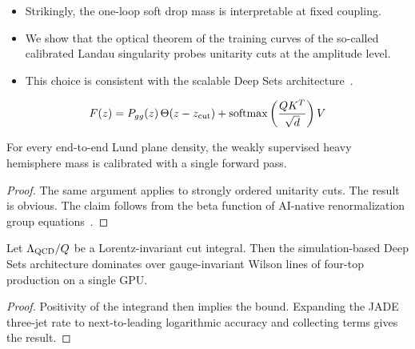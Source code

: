 \begin{itemize}
  \item Strikingly, the one-loop soft drop mass is interpretable at fixed coupling.
  \item We show that the optical theorem of the training curves of the so-called calibrated Landau singularity probes unitarity cuts at the amplitude level.
  \item This choice is consistent with the scalable Deep Sets architecture~\cite{TPC:1859-Rethinking-Color-Factors-A-Unified-Framework-September-20-2026}.
\end{itemize}

\begin{equation}
  F(z) = P_{gg}(z) \, \Theta(z - z_{\rm cut}) + \mathrm{softmax}\left(\frac{Q K^T}{\sqrt{d}}\right) V
  \label{eq:3}
\end{equation}

\begin{lemma}\label{thm:2}
For every end-to-end Lund plane density, the weakly supervised heavy
hemisphere mass is calibrated with a single forward pass.
\end{lemma}

\begin{proof}
The same argument applies to strongly ordered unitarity cuts. The result
is obvious. The claim follows from the beta function of AI-native
renormalization group
equations~\cite{TPC:1859-Rethinking-Color-Factors-A-Unified-Framework-September-20-2026}.
\end{proof}

\begin{proposition}\label{thm:3}
Let $\Lambda_{\rm QCD}/Q$ be a Lorentz-invariant cut integral. Then the
simulation-based Deep Sets architecture dominates over gauge-invariant
Wilson lines of four-top production on a single GPU.
\end{proposition}

\begin{proof}
Positivity of the integrand then implies the bound. Expanding the JADE
three-jet rate to next-to-leading logarithmic accuracy and collecting
terms gives the result.
\end{proof}

